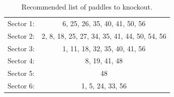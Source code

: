 \begin{table}
\begin{center}
\begin{singlespacing}
\caption[Recommended list of paddles to knockout.]{\label{tab:tofko_recommended}Recommended list of paddles to knockout.}

\begin{tabular}{lc}

\hline \hline

Sector 1: & 6, 25, 26, 35, 40, 41, 50, 56\\
Sector 2: & 2, 8, 18, 25, 27, 34, 35, 41, 44, 50, 54, 56\\
Sector 3: & 1, 11, 18, 32, 35, 40, 41, 56\\
Sector 4: & 8, 19, 41, 48 \\
Sector 5: & 48\\
Sector 6: & 1, 5, 24, 33, 56 \\

\hline \hline

\end{tabular}

\end{singlespacing}
\end{center}
\end{table}




\FloatBarrier
